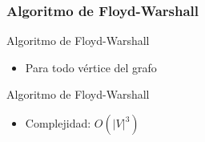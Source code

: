\documentclass[handout]{beamer}
\begin{document}
\subsubsection{Algoritmo de Floyd-Warshall}
\begin{frame}{Algoritmo de Floyd-Warshall}
  \begin{itemize}
    \item Para todo v\'ertice del grafo
  \end{itemize}
\end{frame}

\begin{frame}{Algoritmo de Floyd-Warshall}
  \begin{itemize}
    \item Complejidad: $O(|V|^3)$
  \end{itemize}
\end{frame}
\end{document}
